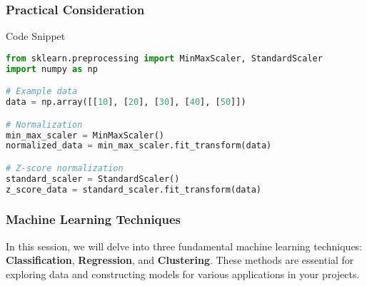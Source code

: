 \documentclass[aspectratio=169]{beamer}
\begin{document}
\begin{frame}[fragile]
    \frametitle{Practical Consideration}
    \begin{block}{Code Snippet}
        \begin{lstlisting}[language=Python]
from sklearn.preprocessing import MinMaxScaler, StandardScaler
import numpy as np

# Example data
data = np.array([[10], [20], [30], [40], [50]])

# Normalization
min_max_scaler = MinMaxScaler()
normalized_data = min_max_scaler.fit_transform(data)

# Z-score normalization
standard_scaler = StandardScaler()
z_score_data = standard_scaler.fit_transform(data)
        \end{lstlisting}
    \end{block}
\end{frame}

\begin{frame}[fragile]
    \frametitle{Machine Learning Techniques}
    In this session, we will delve into three fundamental machine learning techniques: \textbf{Classification}, \textbf{Regression}, and \textbf{Clustering}. These methods are essential for exploring data and constructing models for various applications in your projects.
\end{frame}
\end{document}
